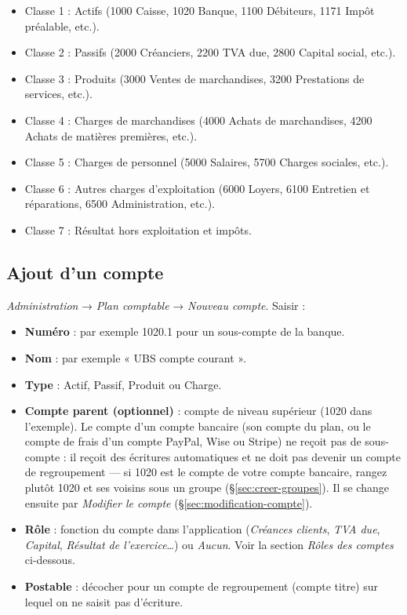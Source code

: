\documentclass[a4paper,11pt,oneside]{article}
\begin{document}
\begin{itemize}
    \item Classe 1 : Actifs (1000 Caisse, 1020 Banque, 1100 Débiteurs, 1171 Impôt préalable, etc.).
    \item Classe 2 : Passifs (2000 Créanciers, 2200 TVA due, 2800 Capital social, etc.).
    \item Classe 3 : Produits (3000 Ventes de marchandises, 3200 Prestations de services, etc.).
    \item Classe 4 : Charges de marchandises (4000 Achats de marchandises, 4200 Achats de matières premières, etc.).
    \item Classe 5 : Charges de personnel (5000 Salaires, 5700 Charges sociales, etc.).
    \item Classe 6 : Autres charges d'exploitation (6000 Loyers, 6100 Entretien et réparations, 6500 Administration, etc.).
    \item Classe 7 : Résultat hors exploitation et impôts.
\end{itemize}

\subsection{Ajout d'un compte}\label{sec:ajout-compte}

\emph{Administration} → \emph{Plan comptable} → \emph{Nouveau compte}. Saisir :

\begin{itemize}
    \item \textbf{Numéro} : par exemple 1020.1 pour un sous-compte de la banque.
    \item \textbf{Nom} : par exemple « UBS compte courant ».
    \item \textbf{Type} : Actif, Passif, Produit ou Charge.
    \item \textbf{Compte parent (optionnel)} : compte de niveau supérieur (1020 dans l'exemple). Le compte d'un compte bancaire (son compte du plan, ou le compte de frais d'un compte PayPal, Wise ou Stripe) ne reçoit pas de sous-compte : il reçoit des écritures automatiques et ne doit pas devenir un compte de regroupement --- si 1020 est le compte de votre compte bancaire, rangez plutôt 1020 et ses voisins sous un groupe (\S\ref{sec:creer-groupes}). Il se change ensuite par \emph{Modifier le compte} (\S\ref{sec:modification-compte}).
    \item \textbf{Rôle} : fonction du compte dans l'application (\emph{Créances clients}, \emph{TVA due}, \emph{Capital}, \emph{Résultat de l'exercice}\ldots) ou \emph{Aucun}. Voir la section \emph{Rôles des comptes} ci-dessous.
    \item \textbf{Postable} : décocher pour un compte de regroupement (compte titre) sur lequel on ne saisit pas d'écriture.
\end{itemize}
\end{document}
